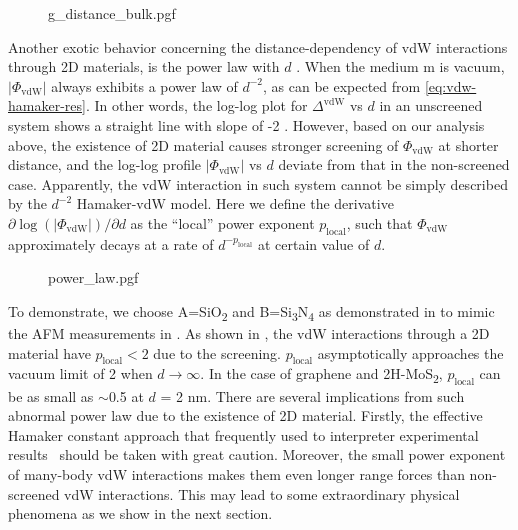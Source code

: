 \begin{figure}[h]
  \centering
  {g_distance_bulk.pgf}
  \caption{\label{fig:vdw-g-dist}}
\end{figure}

Another exotic behavior concerning the distance-dependency of vdW
interactions through 2D materials, is the power law with $d$
.
%
When the medium m is vacuum, \(|\Phi_{\mathrm{vdW}}|\) always exhibits a
power law of \(d^{-2}\), as can be expected from
\autoref{eq:vdw-hamaker-res}.
%
In other words, the log-log plot for \(\Delta^{\mathrm{vdW}}\) vs
\(d\) in an unscreened system shows a straight line with slope of -2
.
%
However, based on our analysis above, the existence of 2D material
causes stronger screening of $\Phi_{\mathrm{vdW}}$ at shorter
distance, and the log-log profile \(|\Phi_{\mathrm{vdW}}|\) vs \(d\)
deviate from that in the non-screened case.
%
Apparently, the vdW interaction in such system cannot be simply
described by the $d^{-2}$ Hamaker-vdW model. Here we define the
derivative $\partial \log(|\Phi_{\mathrm{vdW}}|)/ \partial d$ as the
``local'' power exponent $p_{\mathrm{local}}$, such that
$\Phi_{\mathrm{vdW}}$ approximately decays at a rate of
$d^{-p_{\mathrm{local}}}$ at certain value of $d$.
%

\begin{figure}[h]
  \centering{}
  {power_law.pgf}
  \caption{\label{fig:vdw-power-law}}
\end{figure}
To demonstrate, we choose A=SiO\textsubscript{2} and
B=Si\textsubscript{3}N\textsubscript{4} as demonstrated in
 to mimic the AFM measurements in
\textcite{Tsoi_2014_vdW_screening_2D}.
%
As shown in , the vdW interactions through a 2D material have $p_{\mathrm{local}} < 2$ due to the screening.
\(p_{\mathrm{local}}\) asymptotically approaches the vacuum limit of 2 when $d \to \infty$.
%
In the case of graphene and 2H-MoS\textsubscript{2},
\(p_{\mathrm{local}}\) can be as small as $\sim{}$0.5 at \(d\) = 2 nm.
There are several implications from such abnormal power law due to the
existence of 2D material. Firstly, the effective Hamaker constant
approach that frequently used to interpreter experimental
results~\cite{Tsoi_2014_vdW_screening_2D} should be
taken with great caution. Moreover, the small power exponent of
many-body vdW interactions makes them even longer range forces than
non-screened vdW interactions. This may lead to some extraordinary
physical phenomena as we show in the next section.

